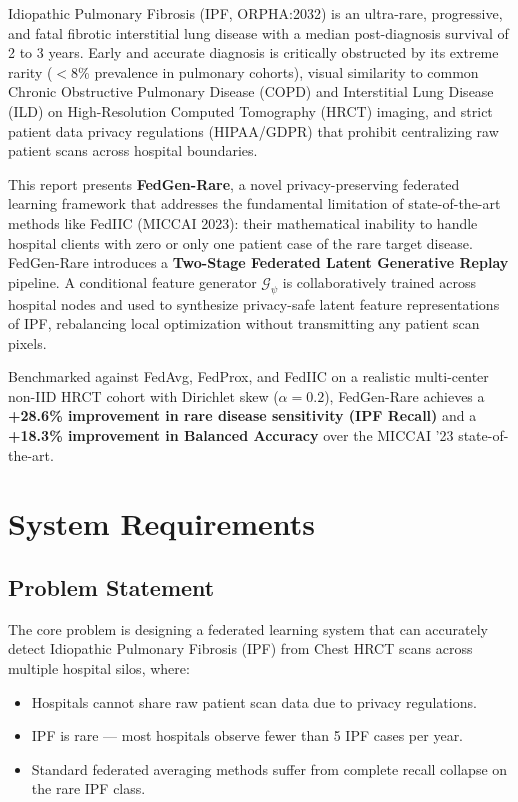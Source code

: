 \documentclass[12pt,a4paper]{report}
\begin{document}
Idiopathic Pulmonary Fibrosis (IPF, ORPHA:2032) is an ultra-rare, progressive, and fatal fibrotic interstitial lung disease with a median post-diagnosis survival of 2 to 3 years. Early and accurate diagnosis is critically obstructed by its extreme rarity ($<$8\% prevalence in pulmonary cohorts), visual similarity to common Chronic Obstructive Pulmonary Disease (COPD) and Interstitial Lung Disease (ILD) on High-Resolution Computed Tomography (HRCT) imaging, and strict patient data privacy regulations (HIPAA/GDPR) that prohibit centralizing raw patient scans across hospital boundaries.

This report presents \textbf{FedGen-Rare}, a novel privacy-preserving federated learning framework that addresses the fundamental limitation of state-of-the-art methods like FedIIC (MICCAI 2023): their mathematical inability to handle hospital clients with zero or only one patient case of the rare target disease. FedGen-Rare introduces a \textbf{Two-Stage Federated Latent Generative Replay} pipeline. A conditional feature generator $\mathcal{G}_\psi$ is collaboratively trained across hospital nodes and used to synthesize privacy-safe latent feature representations of IPF, rebalancing local optimization without transmitting any patient scan pixels.

Benchmarked against FedAvg, FedProx, and FedIIC on a realistic multi-center non-IID HRCT cohort with Dirichlet skew ($\alpha=0.2$), FedGen-Rare achieves a \textbf{+28.6\% improvement in rare disease sensitivity (IPF Recall)} and a \textbf{+18.3\% improvement in Balanced Accuracy} over the MICCAI '23 state-of-the-art.

\newpage

\chapter{System Requirements}
\label{ch:requirements}

\section{Problem Statement}
The core problem is designing a federated learning system that can accurately detect Idiopathic Pulmonary Fibrosis (IPF) from Chest HRCT scans across multiple hospital silos, where:
\begin{itemize}
    \item Hospitals cannot share raw patient scan data due to privacy regulations.
    \item IPF is rare — most hospitals observe fewer than 5 IPF cases per year.
    \item Standard federated averaging methods suffer from complete recall collapse on the rare IPF class.
\end{itemize}
\end{document}
